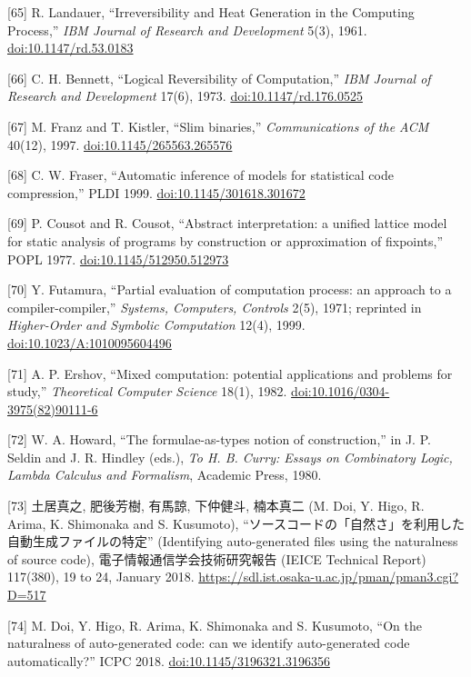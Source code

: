\documentclass[10pt,letterpaper]{article}
\begin{document}
{[}65{]} R. Landauer, ``Irreversibility and Heat Generation in the
Computing Process,'' \emph{IBM Journal of Research and Development}
5(3), 1961.
\href{https://doi.org/10.1147/rd.53.0183}{doi:10.1147/rd.53.0183}

{[}66{]} C. H. Bennett, ``Logical Reversibility of Computation,''
\emph{IBM Journal of Research and Development} 17(6), 1973.
\href{https://doi.org/10.1147/rd.176.0525}{doi:10.1147/rd.176.0525}

{[}67{]} M. Franz and T. Kistler, ``Slim binaries,''
\emph{Communications of the ACM} 40(12), 1997.
\href{https://doi.org/10.1145/265563.265576}{doi:10.1145/265563.265576}

{[}68{]} C. W. Fraser, ``Automatic inference of models for statistical
code compression,'' PLDI 1999.
\href{https://doi.org/10.1145/301618.301672}{doi:10.1145/301618.301672}

{[}69{]} P. Cousot and R. Cousot, ``Abstract interpretation: a unified
lattice model for static analysis of programs by construction or
approximation of fixpoints,'' POPL 1977.
\href{https://doi.org/10.1145/512950.512973}{doi:10.1145/512950.512973}

{[}70{]} Y. Futamura, ``Partial evaluation of computation process: an
approach to a compiler-compiler,'' \emph{Systems, Computers, Controls}
2(5), 1971; reprinted in \emph{Higher-Order and Symbolic Computation}
12(4), 1999.
\href{https://doi.org/10.1023/A:1010095604496}{doi:10.1023/A:1010095604496}

{[}71{]} A. P. Ershov, ``Mixed computation: potential applications and
problems for study,'' \emph{Theoretical Computer Science} 18(1), 1982.
\href{https://doi.org/10.1016/0304-3975(82)90111-6}{doi:10.1016/0304-3975(82)90111-6}

{[}72{]} W. A. Howard, ``The formulae-as-types notion of construction,''
in J. P. Seldin and J. R. Hindley (eds.), \emph{To H. B. Curry: Essays
on Combinatory Logic, Lambda Calculus and Formalism}, Academic Press,
1980.

{[}73{]} 土居真之, 肥後芳樹, 有馬諒, 下仲健斗, 楠本真二 (M. Doi, Y.
Higo, R. Arima, K. Shimonaka and S. Kusumoto),
``ソースコードの「自然さ」を利用した自動生成ファイルの特定''
(Identifying auto-generated files using the naturalness of source code),
電子情報通信学会技術研究報告 (IEICE Technical Report) 117(380), 19 to
24, January 2018.
\url{https://sdl.ist.osaka-u.ac.jp/pman/pman3.cgi?D=517}

{[}74{]} M. Doi, Y. Higo, R. Arima, K. Shimonaka and S. Kusumoto, ``On
the naturalness of auto-generated code: can we identify auto-generated
code automatically?'' ICPC 2018.
\href{https://doi.org/10.1145/3196321.3196356}{doi:10.1145/3196321.3196356}
\end{document}
